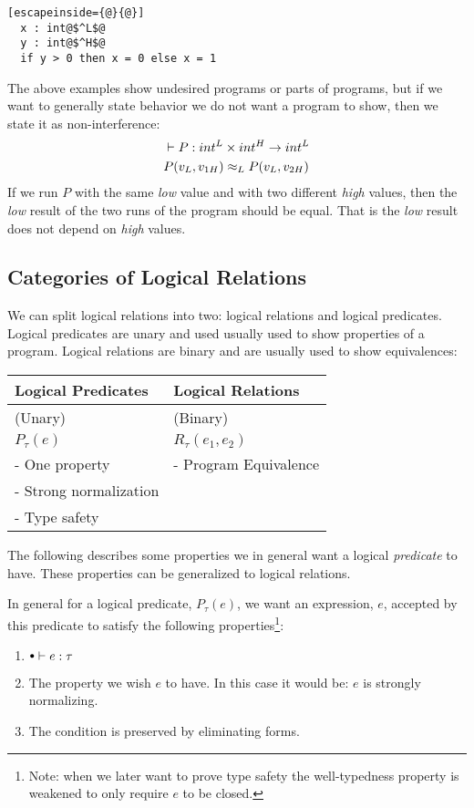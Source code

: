 \begin{itemize}
\begin{itemize}
\begin{lstlisting}[escapeinside={@}{@}]
  x : int@$^L$@
  y : int@$^H$@
  if y > 0 then x = 0 else x = 1
        \end{lstlisting}
The above examples show undesired programs or parts of programs, but if we want to generally state behavior we do not want a program to show, then we state it as non-interference:
\begin{align*}
  & \vdash P :  int^L \times int^H \rightarrow int^L \\
  & P(v_L,v_{1H}) \approx_L P(v_L,v_{2H})
\end{align*}
If we run $P$ with the same \emph{low} value and with two different \emph{high} values, then the \emph{low} result of the two runs of the program should be equal. That is the \emph{low} result does not depend on \emph{high} values.
  \end{itemize}
\end{itemize}
\subsection*{Categories of Logical Relations}
We can split logical relations into two: logical relations and logical predicates. Logical predicates are unary and used usually used to show properties of a program. Logical relations are binary and are usually used to show equivalences:\\
\begin{tabular}{l | l}
  Logical Predicates     & Logical Relations    \\
\hline
  (Unary)                & (Binary)             \\
  $P_\tau(e)$             & $R_\tau(e_1,e_2)$     \\
  - One property         & - Program Equivalence\\ %
  - Strong normalization & \\
  - Type safety          & \\
\end{tabular}
The following describes some properties we in general want a logical \emph{predicate} to have. These properties can be generalized to logical relations.

In general for a logical predicate, $P_\tau(e)$, we want an expression, $e$, accepted by this predicate to satisfy the following properties\footnote{Note: when we later want to prove type safety the well-typedness property is weakened to only require $e$ to be closed.}:
\begin{enumerate}
\item $\mtenv \vdash e : \tau$
\item The property we wish $e$ to have. In this case it would be: $e$ is strongly normalizing.
\item The condition is preserved by eliminating forms.
\end{enumerate}

